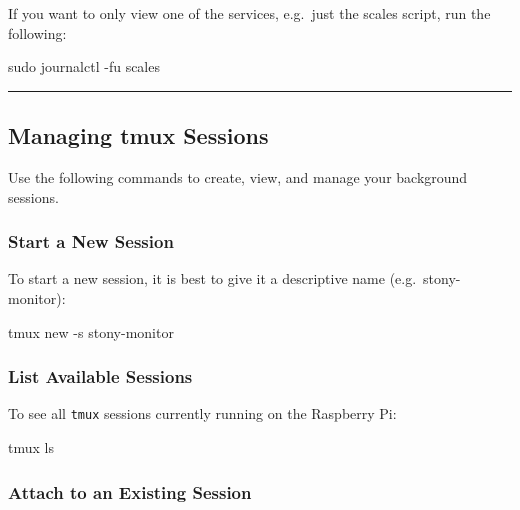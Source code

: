 \documentclass[
  letterpaper,
]{scrbook}
\newenvironment{Shaded}{\begin{snugshade}}{\end{snugshade}}
\newcommand{\AttributeTok}[1]{\textcolor[rgb]{0.40,0.45,0.13}{#1}}
\newcommand{\ExtensionTok}[1]{\textcolor[rgb]{0.00,0.23,0.31}{#1}}
\newcommand{\FunctionTok}[1]{\textcolor[rgb]{0.28,0.35,0.67}{#1}}
\newcommand{\NormalTok}[1]{\textcolor[rgb]{0.00,0.23,0.31}{#1}}
\begin{document}
If you want to only view one of the services, e.g.~just the scales
script, run the following:

\begin{Shaded}
\begin{Highlighting}[]
\FunctionTok{sudo}\NormalTok{ journalctl }\AttributeTok{{-}fu}\NormalTok{ scales}
\end{Highlighting}
\end{Shaded}

\begin{center}\rule{0.5\linewidth}{0.5pt}\end{center}

\subsection{Managing tmux Sessions}\label{managing-tmux-sessions}

Use the following commands to create, view, and manage your background
sessions.

\subsubsection{Start a New Session}\label{start-a-new-session}

To start a new session, it is best to give it a descriptive name
(e.g.~stony-monitor):

\begin{Shaded}
\begin{Highlighting}[]
\ExtensionTok{tmux}\NormalTok{ new }\AttributeTok{{-}s}\NormalTok{ stony{-}monitor}
\end{Highlighting}
\end{Shaded}

\subsubsection{List Available Sessions}\label{list-available-sessions}

To see all \texttt{tmux} sessions currently running on the Raspberry Pi:

\begin{Shaded}
\begin{Highlighting}[]
\ExtensionTok{tmux}\NormalTok{ ls}
\end{Highlighting}
\end{Shaded}

\subsubsection{Attach to an Existing
Session}\label{attach-to-an-existing-session}
\end{document}
